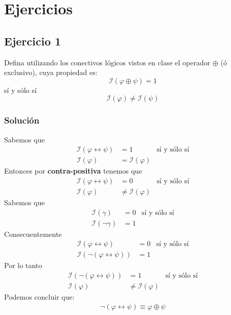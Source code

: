 \documentclass[a4paper]{article}
\begin{document}
\section{Ejercicios}
\subsection{Ejercicio 1}
Defina utilizando los conectivos lógicos vistos en clase el operador
$\oplus$ (ó exclusivo), cuya propiedad es:
\[
    \mathcal{I}\left(\varphi \oplus \psi\right) = 1
\]
sí y sólo sí
\[
    \mathcal{I}\left(\varphi\right) \neq \mathcal{I}\left(\psi\right)
\]
\subsubsection{Solución}
Sabemos que 
\begin{align*}
    \mathcal{I}\left(\varphi \leftrightarrow \psi\right) &= 1 &\text{sí y sólo sí} \\
    \mathcal{I}\left(\varphi\right) &= \mathcal{I}\left(\varphi\right)
\end{align*}
Entonces por \textbf{contra-positiva} tenemos que
\begin{align*}
    \mathcal{I}\left(\varphi \leftrightarrow \psi\right) &= 0 &\text{sí y sólo sí} \\
    \mathcal{I}\left(\varphi\right) &\neq \mathcal{I}\left(\varphi\right)
\end{align*}
Sabemos que 
\begin{align*}
    \mathcal{I}\left(\gamma\right) &= 0 &\text{sí y sólo sí} \\
    \mathcal{I}\left(\neg \gamma\right) &=1 &
\end{align*}
Consecuentemente
\begin{align*}
    \mathcal{I}\left(\varphi \leftrightarrow \psi\right) &= 0 &\text{sí y sólo sí} \\
    \mathcal{I}\left(\neg \left(\varphi \leftrightarrow \psi\right)\right) &= 1
\end{align*}
Por lo tanto
\begin{align*}
    \mathcal{I}\left(\neg \left(\varphi \leftrightarrow \psi\right)\right) &= 1 &\text{sí y sólo sí} \\
    \mathcal{I}\left(\varphi\right) &\neq \mathcal{I}\left(\varphi\right)    
\end{align*}
Podemos concluir que:
\begin{align*}
    \neg \left(\varphi \leftrightarrow \psi\right) \equiv \varphi \oplus \psi
\end{align*}
\end{document}
